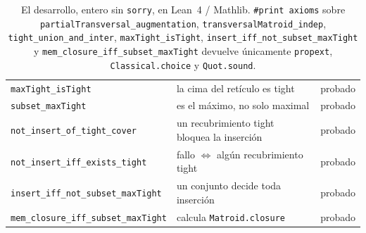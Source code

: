 \documentclass[11pt]{article}
\newcommand{\lean}[1]{\texttt{#1}}
\begin{document}
\begin{table}[H]
\begin{tabular}{@{}llc@{}}
    \rowcolor{tmband}
    \lean{maxTight\_isTight} & la cima del retículo es tight & probado \\
    \lean{subset\_maxTight} & es el máximo, no solo maximal & probado \\
    \rowcolor{tmband}
    \lean{not\_insert\_of\_tight\_cover} & un recubrimiento tight bloquea la inserción & probado \\
    \lean{not\_insert\_iff\_exists\_tight} & fallo $\iff$ algún recubrimiento tight & probado \\
    \rowcolor{tmband}
    \lean{insert\_iff\_not\_subset\_maxTight} & un conjunto decide toda inserción & probado \\
    \rowcolor{tmband}
    \lean{mem\_closure\_iff\_subset\_maxTight} & calcula \lean{Matroid.closure} & probado \\
    \bottomrule
  \end{tabular}
  \caption{El desarrollo, entero sin \lean{sorry}, en Lean~4 / Mathlib. \lean{\#print axioms} sobre
  \lean{partialTransversal\_augmentation}, \lean{transversalMatroid\_indep},
  \lean{tight\_union\_and\_inter}, \lean{maxTight\_isTight},
  \lean{insert\_iff\_not\_subset\_maxTight} y \lean{mem\_closure\_iff\_subset\_maxTight}
  devuelve únicamente \lean{propext}, \lean{Classical.choice} y \lean{Quot.sound}.}
  \label{tab:results}
\end{table}
\end{document}
